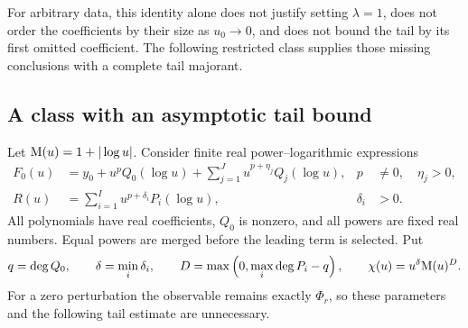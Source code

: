 For arbitrary data, this identity alone does not justify setting $\lambda=1$,
does not order the coefficients by their size as $u_0\to0$, and does not
bound the tail by its first omitted coefficient. The following restricted
class supplies those missing conclusions with a complete tail majorant.

\subsection{A class with an asymptotic tail bound}

Let $\mathrm M(u)=1+|\log u|$. Consider finite real power--logarithmic expressions
\begin{align}
 F_0(u)&=y_0+u^p Q_0(\log u)
       +\sum_{j=1}^{J}u^{p+\eta_j}Q_j(\log u),
       &p&\ne0,\quad \eta_j>0,\label{eq:core-admissible-core}\\
 R(u)&=\sum_{i=1}^{I}u^{p+\delta_i}P_i(\log u),
       &\delta_i&>0.\label{eq:core-admissible-perturbation}
\end{align}
All polynomials have real coefficients, $Q_0$ is nonzero, and all powers
are fixed real numbers. Equal powers are merged before the leading term
is selected. Put
\begin{equation}
 q=\deg Q_0,\qquad
 \delta=\min_i\delta_i,\qquad
 D=\max\left(0,\max_i\deg P_i-q\right),\qquad
 \chi(u)=u^\delta\mathrm M(u)^D.
 \label{eq:core-small-scale}
\end{equation}
For a zero perturbation the observable remains exactly $\Phi_r$, so these
parameters and the following tail estimate are unnecessary.

